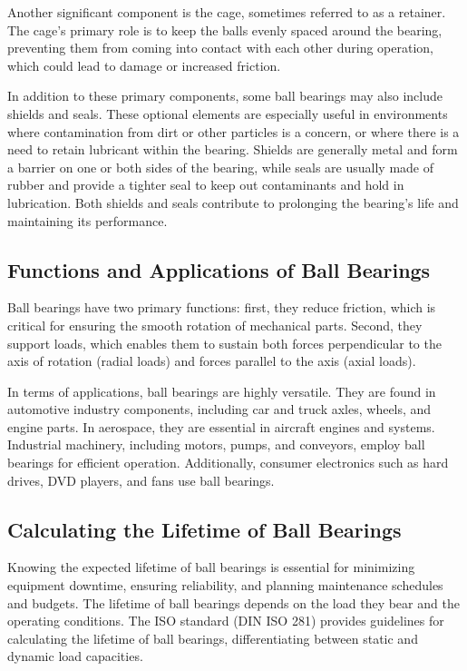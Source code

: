 Another significant component is the cage, sometimes referred to as a retainer. The cage's primary role is to keep the balls evenly spaced around the bearing, preventing them from coming into contact with each other during operation, which could lead to damage or increased friction.

In addition to these primary components, some ball bearings may also include shields and seals. These optional elements are especially useful in environments where contamination from dirt or other particles is a concern, or where there is a need to retain lubricant within the bearing. Shields are generally metal and form a barrier on one or both sides of the bearing, while seals are usually made of rubber and provide a tighter seal to keep out contaminants and hold in lubrication. Both shields and seals contribute to prolonging the bearing's life and maintaining its performance.

\subsection{Functions and Applications of Ball Bearings}

Ball bearings have two primary functions: first, they reduce friction, which is critical for ensuring the smooth rotation of mechanical parts. Second, they support loads, which enables them to sustain both forces perpendicular to the axis of rotation (radial loads) and forces parallel to the axis (axial loads).

In terms of applications, ball bearings are highly versatile. They are found in automotive industry components, including car and truck axles, wheels, and engine parts. In aerospace, they are essential in aircraft engines and systems. Industrial machinery, including motors, pumps, and conveyors, employ ball bearings for efficient operation. Additionally, consumer electronics such as hard drives, DVD players, and fans use ball bearings.


\subsection{Calculating the Lifetime of Ball Bearings}

Knowing the expected lifetime of ball bearings is essential for minimizing equipment downtime, ensuring reliability, and planning maintenance schedules and budgets. The lifetime of ball bearings depends on the load they bear and the operating conditions. The ISO standard (DIN ISO 281) provides guidelines for calculating the lifetime of ball bearings, differentiating between static and dynamic load capacities.

